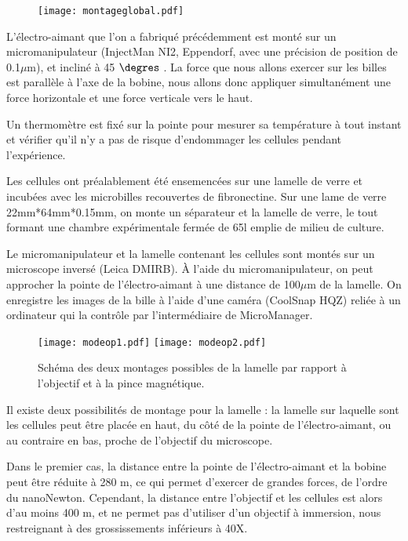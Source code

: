		 \begin{figure}
		 \texttt{[image: montageglobal.pdf]}
		 \label{montage global}
		 \end{figure}
		 
		 L'électro-aimant que l'on a fabriqué précédemment est monté sur un micromanipulateur (InjectMan NI2, Eppendorf, avec une précision de position de 0.1$\mu$m), et incliné à 45 $\degres$ . La force que nous allons exercer sur les billes est parallèle à l'axe de la bobine, nous allons donc appliquer simultanément une force horizontale et une force verticale vers le haut. 
		 
		 Un thermomètre est fixé sur la pointe pour mesurer sa température à tout instant et vérifier qu'il n'y a pas de risque d'endommager les cellules pendant l'expérience. 
		 
		 Les cellules ont préalablement été ensemencées sur une lamelle de verre et incubées avec les microbilles recouvertes de fibronectine. Sur une lame de verre 22mm*64mm*0.15mm, on monte un séparateur et la lamelle de verre, le tout formant une chambre expérimentale fermée de 65\micro l emplie de milieu de culture. 		 
		 
		 Le micromanipulateur et la lamelle contenant les cellules sont montés sur un microscope inversé (Leica DMIRB). \`A l'aide du micromanipulateur, on peut approcher la pointe de l'électro-aimant à une distance de 100$\mu$m de la lamelle. On enregistre les images de la bille à l'aide d'une caméra (CoolSnap HQZ) reliée à un ordinateur qui la contrôle par l'intermédiaire de MicroManager. 
		 
		 \begin{figure}
		 \texttt{[image: modeop1.pdf]}
		 \texttt{[image: modeop2.pdf]}
		 \caption{Schéma des deux montages possibles de la lamelle par rapport à l'objectif et à la pince magnétique.}
		 \end{figure}
		 
		 Il existe deux possibilités de montage pour la lamelle : la lamelle sur laquelle sont les cellules peut être placée en haut, du côté de la pointe de l'électro-aimant, ou au contraire en bas, proche de l'objectif du microscope. 
		 
		 Dans le premier cas, la distance entre la pointe de l'électro-aimant et la bobine peut être réduite à 280 \micro m, ce qui permet d'exercer de grandes forces, de l'ordre du nanoNewton. Cependant, la distance entre l'objectif et les cellules est alors d'au moins 400 \micro m, et ne permet pas d'utiliser d'un objectif à immersion, nous restreignant à des grossissements inférieurs à 40X. 

